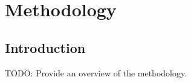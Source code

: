\chapter{Methodology}
\label{sec:methodology}


\section{Introduction}
TODO: Provide an overview of the methodology.

